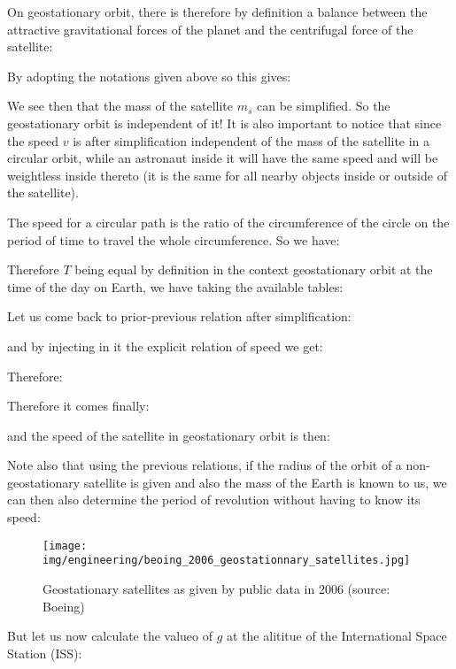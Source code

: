 	On geostationary orbit, there is therefore by definition a balance between the attractive gravitational forces of the planet and the centrifugal force of the satellite:
	
	By adopting the notations given above so this gives:
	
	We see then that the mass of the satellite $m_s$ can be simplified. So the geostationary orbit is independent of it! It is also important to notice that since the speed $v$ is after simplification independent of the mass of the satellite in a circular orbit, while an astronaut inside it will have the same speed and will be weightless inside thereto (it is the same for all nearby objects inside or outside of the satellite).
	
	The speed for a circular path is the ratio of the circumference of the circle on the period of time to travel the whole circumference. So we have:
	
	Therefore $T$ being equal by definition in the context geostationary orbit at the time of the day on Earth, we have taking the available tables:
	
	Let us come back to prior-previous relation after simplification:
	
	and by injecting in it the explicit relation of speed we get:
	
	Therefore:
	
	Therefore it comes finally:
	
	and the speed of the satellite in geostationary orbit is then:
	
	Note also that using the previous relations, if the radius of the orbit of a non-geostationary satellite is given and also the mass of the Earth is known to us, we can then also determine the period of revolution without having to know its speed:
	
	\begin{figure}[H]
		\centering
		\texttt{[image: img/engineering/beoing\_2006\_geostationnary\_satellites.jpg]}
		\caption[Geostationary satellites as given by public data in 2006]{Geostationary satellites as given by public data in 2006 (source: Boeing)}
	\end{figure}
	But let us now calculate the valueo of $g$ at the alititue of the International Space Station (ISS):
	
